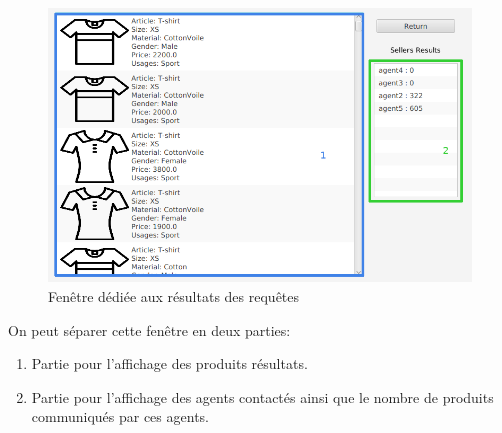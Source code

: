 \begin{figure}[H]
	\centering
	\includegraphics[scale=0.4]{imgs/agentUI2.png}
	\caption{Fenêtre dédiée aux résultats des requêtes}
	\label{fig:queryResult}
\end{figure}
On peut séparer cette fenêtre en deux parties:
\begin{enumerate}
	\item Partie pour l’affichage des produits résultats.
	\item Partie pour l’affichage des agents contactés ainsi que le nombre de produits communiqués par ces agents.
\end{enumerate}



